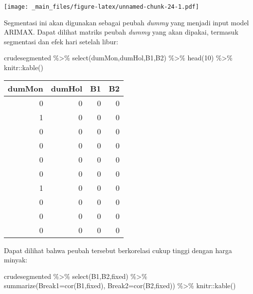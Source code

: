 \documentclass[
]{book}
\newenvironment{Shaded}{\begin{snugshade}}{\end{snugshade}}
\newcommand{\AttributeTok}[1]{\textcolor[rgb]{0.77,0.63,0.00}{#1}}
\newcommand{\DecValTok}[1]{\textcolor[rgb]{0.00,0.00,0.81}{#1}}
\newcommand{\FunctionTok}[1]{\textcolor[rgb]{0.00,0.00,0.00}{#1}}
\newcommand{\NormalTok}[1]{#1}
\newcommand{\SpecialCharTok}[1]{\textcolor[rgb]{0.00,0.00,0.00}{#1}}
\begin{document}
\texttt{[image: \_main\_files/figure-latex/unnamed-chunk-24-1.pdf]}

Segmentasi ini akan digunakan sebagai peubah \emph{dummy} yang menjadi input model ARIMAX. Dapat dilihat matriks peubah \emph{dummy} yang akan dipakai, termasuk segmentasi dan efek hari setelah libur:

\begin{Shaded}
\begin{Highlighting}[]
\NormalTok{crudesegmented }\SpecialCharTok{\%\textgreater{}\%} \FunctionTok{select}\NormalTok{(dumMon,dumHol,B1,B2) }\SpecialCharTok{\%\textgreater{}\%} \FunctionTok{head}\NormalTok{(}\DecValTok{10}\NormalTok{) }\SpecialCharTok{\%\textgreater{}\%} 
\NormalTok{  knitr}\SpecialCharTok{::}\FunctionTok{kable}\NormalTok{()}
\end{Highlighting}
\end{Shaded}

\begin{tabular}{r|r|r|r}
\hline
dumMon & dumHol & B1 & B2\\
\hline
0 & 0 & 0 & 0\\
\hline
1 & 0 & 0 & 0\\
\hline
0 & 0 & 0 & 0\\
\hline
0 & 0 & 0 & 0\\
\hline
0 & 0 & 0 & 0\\
\hline
0 & 0 & 0 & 0\\
\hline
1 & 0 & 0 & 0\\
\hline
0 & 0 & 0 & 0\\
\hline
0 & 0 & 0 & 0\\
\hline
0 & 0 & 0 & 0\\
\hline
\end{tabular}

Dapat dilihat bahwa peubah tersebut berkorelasi cukup tinggi dengan harga minyak:

\begin{Shaded}
\begin{Highlighting}[]
\NormalTok{crudesegmented }\SpecialCharTok{\%\textgreater{}\%} \FunctionTok{select}\NormalTok{(B1,B2,fixed) }\SpecialCharTok{\%\textgreater{}\%} \FunctionTok{summarize}\NormalTok{(}\AttributeTok{Break1=}\FunctionTok{cor}\NormalTok{(B1,fixed),}
                                                     \AttributeTok{Break2=}\FunctionTok{cor}\NormalTok{(B2,fixed)) }\SpecialCharTok{\%\textgreater{}\%}
\NormalTok{  knitr}\SpecialCharTok{::}\FunctionTok{kable}\NormalTok{()}
\end{Highlighting}
\end{Shaded}
\end{document}
